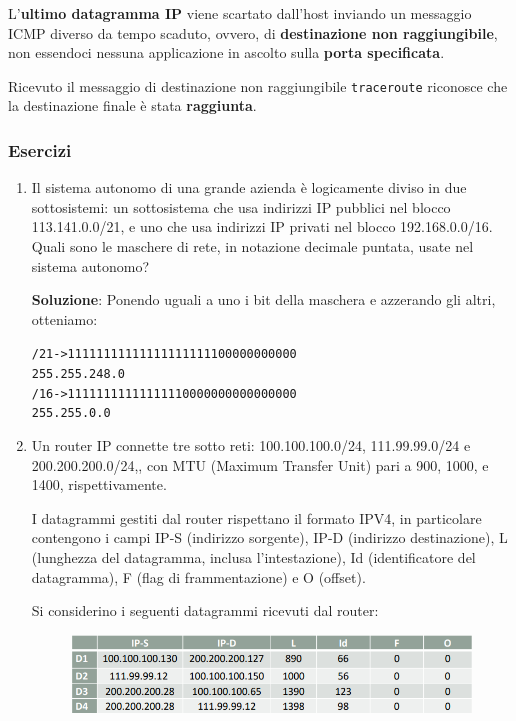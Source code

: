 \documentclass[11pt,a4paper,oneside]{book}
\theoremstyle{definition}
\begin{document}
\begin{itemize}
	      L'\textbf{ultimo datagramma IP} viene scartato dall'host inviando un messaggio ICMP diverso da tempo scaduto, ovvero, di \textbf{destinazione non raggiungibile}, non essendoci nessuna applicazione in ascolto sulla \textbf{porta specificata}.

	      Ricevuto il messaggio di destinazione non raggiungibile \texttt{traceroute} riconosce che la destinazione finale è stata \textbf{raggiunta}.

\end{itemize}

\subsubsection{Esercizi}
\begin{enumerate}
	\item Il sistema autonomo di una grande azienda è logicamente diviso in due sottosistemi: un sottosistema che usa indirizzi IP pubblici nel blocco 113.141.0.0/21, e uno che usa indirizzi IP privati nel blocco 192.168.0.0/16. Quali sono le maschere di rete, in notazione decimale puntata, usate nel sistema autonomo?

	      \textbf{Soluzione}: Ponendo uguali a uno i bit della maschera e azzerando gli altri, otteniamo:
	      \begin{alltt}
		      \centering
		      /21 -> 11111111 11111111 11111000 00000000
		      255.255. 248.0
		      /16 -> 11111111 11111111 00000000 00000000
		      255.255.0.0
	      \end{alltt}

	      \pagebreak

	\item Un router IP connette tre sotto reti: 100.100.100.0/24, 111.99.99.0/24 e
	      200.200.200.0/24,, con MTU (Maximum Transfer Unit) pari a 900, 1000, e
	      1400, rispettivamente.

	      I datagrammi gestiti dal router rispettano il formato IPV4, in particolare
	      contengono i campi IP-S (indirizzo sorgente), IP-D (indirizzo destinazione), L
	      (lunghezza del datagramma, inclusa l’intestazione), Id (identificatore del
	      datagramma), F (flag di frammentazione) e O (offset).

	      Si considerino i seguenti datagrammi ricevuti dal router:
	      \begin{figure}[!h]
		      \includegraphics[scale=0.4]{Immagini/Ip_es2.png}
		      \centering
	      \end{figure}


\end{enumerate}
\end{document}
